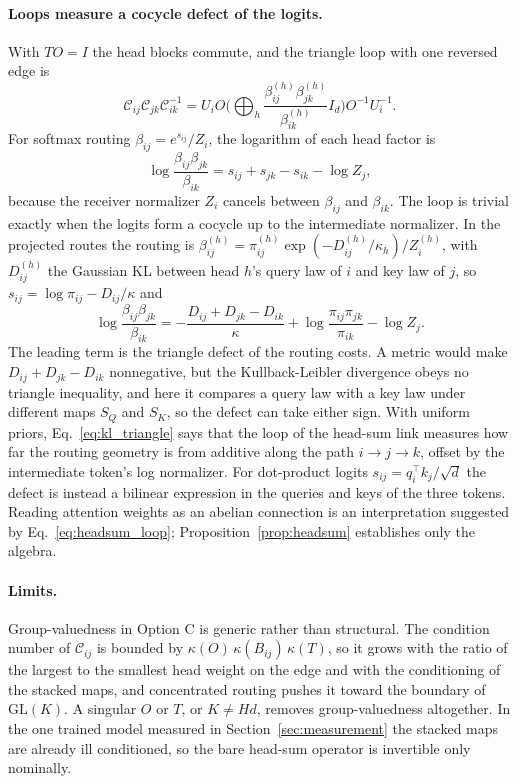 \documentclass[11pt]{article}
\theoremstyle{definition}
\theoremstyle{remark}
\newcommand{\GL}{\mathrm{GL}}
\begin{document}
\paragraph{Loops measure a cocycle defect of the logits.}
With $TO=I$ the head blocks commute, and the triangle loop with one reversed edge is
\begin{equation}
\mathcal C_{ij}\mathcal C_{jk}\mathcal C_{ik}^{-1}
=U_iO\Big(\bigoplus_h\frac{\beta_{ij}^{(h)}\beta_{jk}^{(h)}}{\beta_{ik}^{(h)}}I_d\Big)O^{-1}U_i^{-1}.
\label{eq:headsum_loop}
\end{equation}
For softmax routing $\beta_{ij}=e^{s_{ij}}/Z_i$, the logarithm of each head factor is
\begin{equation}
\log\frac{\beta_{ij}\beta_{jk}}{\beta_{ik}}=s_{ij}+s_{jk}-s_{ik}-\log Z_j,
\label{eq:cocycle}
\end{equation}
because the receiver normalizer $Z_i$ cancels between $\beta_{ij}$ and $\beta_{ik}$. The loop is trivial exactly when the logits form a cocycle up to the intermediate normalizer. In the projected routes the routing is $\beta_{ij}^{(h)}=\pi_{ij}^{(h)}\exp(-D_{ij}^{(h)}/\kappa_h)/Z_i^{(h)}$, with $D_{ij}^{(h)}$ the Gaussian KL between head $h$'s query law of $i$ and key law of $j$, so $s_{ij}=\log\pi_{ij}-D_{ij}/\kappa$ and
\begin{equation}
\log\frac{\beta_{ij}\beta_{jk}}{\beta_{ik}}=-\frac{D_{ij}+D_{jk}-D_{ik}}{\kappa}+\log\frac{\pi_{ij}\pi_{jk}}{\pi_{ik}}-\log Z_j.
\label{eq:kl_triangle}
\end{equation}
The leading term is the triangle defect of the routing costs. A metric would make $D_{ij}+D_{jk}-D_{ik}$ nonnegative, but the Kullback-Leibler divergence obeys no triangle inequality, and here it compares a query law with a key law under different maps $S_Q$ and $S_K$, so the defect can take either sign. With uniform priors, Eq.~\eqref{eq:kl_triangle} says that the loop of the head-sum link measures how far the routing geometry is from additive along the path $i\to j\to k$, offset by the intermediate token's log normalizer. For dot-product logits $s_{ij}=q_i^\top k_j/\sqrt d$ the defect is instead a bilinear expression in the queries and keys of the three tokens. Reading attention weights as an abelian connection is an interpretation suggested by Eq.~\eqref{eq:headsum_loop}; Proposition~\ref{prop:headsum} establishes only the algebra.

\paragraph{Limits.}
Group-valuedness in Option C is generic rather than structural. The condition number of $\mathcal C_{ij}$ is bounded by $\kappa(O)\,\kappa(B_{ij})\,\kappa(T)$, so it grows with the ratio of the largest to the smallest head weight on the edge and with the conditioning of the stacked maps, and concentrated routing pushes it toward the boundary of $\GL(K)$. A singular $O$ or $T$, or $K\ne Hd$, removes group-valuedness altogether. In the one trained model measured in Section~\ref{sec:measurement} the stacked maps are already ill conditioned, so the bare head-sum operator is invertible only nominally.
\end{document}
